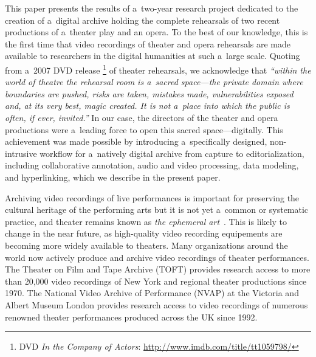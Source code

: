 \documentclass[conference]{IEEEtran}
\newcommand{\todo}[1]{\noindent\textcolor{red}{{\bf \{ToDo} #1{\bf \}}}}
\begin{document}
This paper presents the results of a~two-year research project dedicated to the creation of a~digital archive holding the complete  rehearsals of  two recent productions of a~theater play and  an opera. To the best of our knowledge, this is the first time that video recordings of theater and opera rehearsals  are made available to researchers in the digital humanities at such a~large scale. Quoting from a~2007 DVD release%
\footnote{DVD \emph{In the Company of Actors}: \url{http://www.imdb.com/title/tt1059798/}}
of theater rehearsals, we acknowledge that  {\em ``within the world of theatre the rehearsal room is a~sacred space---the private domain where boundaries are pushed, risks are taken, mistakes made, vulnerabilities exposed and, at its very best, magic created. It is not a~place into which the public is often, if ever, invited.''} In our case, the directors of the theater and opera productions were a~leading force to open this sacred space---digitally.  This achievement was made possible by introducing a~specifically designed, non-intrusive workflow for a~natively digital archive from capture to editorialization, including collaborative annotation, audio and video processing, data modeling,  and hyperlinking, which we describe in the present paper.






Archiving video recordings of live performances is important for preserving the cultural heritage of the performing arts but it is not yet a~common or systematic practice, and theater remains known as {\em the ephemeral art}~\cite{Reason06,Bouchez07}. This is likely to change in the near future, as high-quality video recording equipements are becoming more widely available to theaters.   Many organizations around the world now actively produce and archive video recordings of theater performances. The Theater on Film and Tape Archive (TOFT) provides research access to more than 20,000 video recordings of New York and regional theater productions since 1970.  The National Video Archive of Performance (NVAP) at the Victoria and Albert Museum London provides research access to video recordings of numerous renowned theater performances produced across the UK since 1992. 
\end{document}
